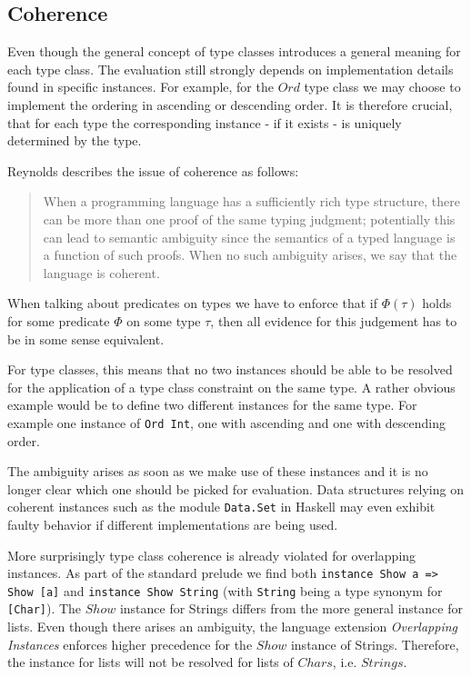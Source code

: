 \subsection{Coherence}\label{sec:coherence}

Even though the general concept of type classes introduces a general meaning for each type class.
The evaluation still strongly depends on implementation details found in specific instances.
For example, for the $\mathit{Ord}$ type class we may choose to implement the ordering in ascending or descending order.
It is therefore crucial, that for each type the corresponding instance - if it exists - is uniquely determined by the type.

Reynolds \cite{reynolds_coherence} describes the issue of coherence as follows:

\begin{quote}
  When a programming language has a sufficiently rich type structure, there can be more than one proof of the same
  typing judgment; potentially this can lead to semantic ambiguity since the semantics of a typed language is a function
  of such proofs. When no such ambiguity arises, we say that the language is coherent.
\end{quote}

When talking about predicates on types we have to enforce that if $\Phi(\tau)$ holds for some predicate $\Phi$ on some type $\tau$,
then all evidence for this judgement has to be in some sense equivalent.

For type classes, this means that no two instances should be able to be resolved for the application of a type class constraint on the same type.
A rather obvious example would be to define two different instances for the same type.
For example one instance of \texttt{Ord Int}, one with ascending and one with descending order.

The ambiguity arises as soon as we make use of these instances and it is no longer clear which one should be picked for evaluation.
Data structures relying on coherent instances such as the module \texttt{Data.Set} in Haskell may even exhibit faulty behavior if different implementations are being used. \cite{Kilpatrick2019-cy}

More surprisingly type class coherence is already violated for overlapping instances.
As part of the standard prelude we find both \texttt{instance Show a => Show [a]} and \texttt{instance Show String}
(with \texttt{String} being a type synonym for \texttt{[Char]}).
The $\mathit{Show}$ instance for Strings differs from the more general instance for lists.
Even though there arises an ambiguity, the language extension \emph{Overlapping Instances} enforces higher precedence for the $Show$ instance of Strings.
Therefore, the instance for lists will not be resolved for lists of $Chars$, i.e. $Strings$.

